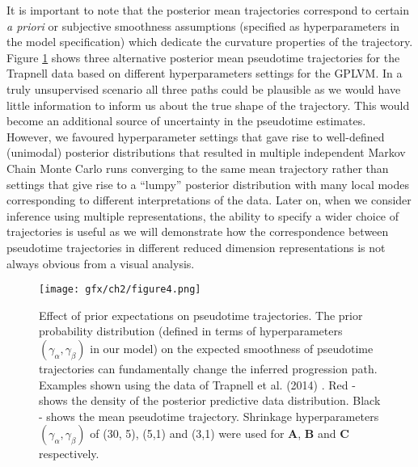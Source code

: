 It is important to note that the posterior mean trajectories correspond to certain \textit{a priori} or subjective smoothness assumptions (specified as hyperparameters in the model specification) which dedicate the curvature properties of the trajectory. Figure \ref{fig:varygamma} shows three alternative posterior mean pseudotime trajectories for the Trapnell data based on different hyperparameters settings for the GPLVM. In a truly unsupervised scenario all three paths could be plausible as we would have little information to inform us about the true shape of the trajectory. This would become an additional source of uncertainty in the pseudotime estimates. However, we favoured hyperparameter settings that gave rise to well-defined (unimodal) posterior distributions that resulted in multiple independent Markov Chain Monte Carlo runs converging to the same mean trajectory rather than settings that give rise to a ``lumpy'' posterior distribution with many local modes corresponding to different interpretations of the data. Later on, when we consider inference using multiple representations, the ability to specify a wider choice of trajectories is useful as we will demonstrate how the correspondence between pseudotime trajectories in different reduced dimension representations is not always obvious from a visual analysis.

\begin{figure}

	\centering
	\texttt{[image: gfx/ch2/figure4.png]}
  \caption{Effect of prior expectations on pseudotime trajectories.
      The prior probability distribution (defined in terms of hyperparameters $(\gamma_\alpha, \gamma_\beta)$ in our model) on the expected smoothness of pseudotime trajectories can fundamentally change the inferred progression path. Examples shown using the data of Trapnell et al. (2014) \cite{Trapnell2014-xi}. Red - shows the density of the posterior predictive data distribution. Black - shows the mean pseudotime trajectory. Shrinkage hyperparameters $(\gamma_\alpha, \gamma_\beta)$ of (30, 5), (5,1) and (3,1) were used for \textbf{A}, \textbf{B} and \textbf{C} respectively.}
	\label{fig:varygamma}
\end{figure}

